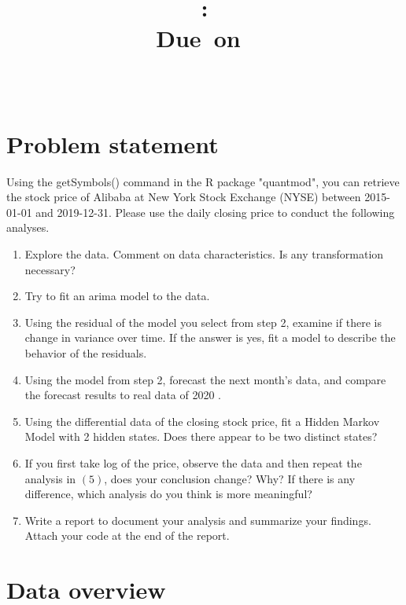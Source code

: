 \documentclass{article}
\title{
    \vspace{2in}
    \textmd{\textbf{\hmwkClass: \hmwkTitle}}\\
    \normalsize\vspace{0.1in}\small{Due\ on\ \hmwkDueDate}\\
    \vspace{0.1in}\large{\textit{\hmwkClassInstructor\ \hmwkClassTime}}
    \vspace{3in}
}
\author{\textbf{\hmwkAuthorName}}
\date{}
\begin{document}
\maketitle
\thispagestyle{empty}
\pagebreak
\thispagestyle{empty}
\tableofcontents

\newpage
\setcounter{page}{1}
\section{Problem statement}
Using the {\ttfamily getSymbols()} command in the R package {\ttfamily"quantmod"}, you can retrieve the stock price of Alibaba at New York Stock Exchange (NYSE) between 2015-01-01 and 2019-12-31. Please use the daily closing price to conduct the following analyses.
\begin{enumerate}[(1)]
    \item Explore the data. Comment on data characteristics. Is any transformation necessary?
    \item Try to fit an arima model to the data.
    \item Using the residual of the model you select from step 2, examine if there is change in variance over time. If the answer is yes, fit a model to describe the behavior of the residuals.
    \item Using the model from step 2, forecast the next month's data, and compare the forecast results to real data of 2020 .
    \item Using the differential data of the closing stock price, fit a Hidden Markov Model with 2 hidden states. Does there appear to be two distinct states?
    \item If you first take log of the price, observe the data and then repeat the analysis in $(5)$, does your conclusion change? Why? If there is any difference, which analysis do you think is more meaningful?
    \item Write a report to document your analysis and summarize your findings. Attach your code at the end of the report.
\end{enumerate}
\vspace{4pt}
\section{Data overview}
\end{document}

